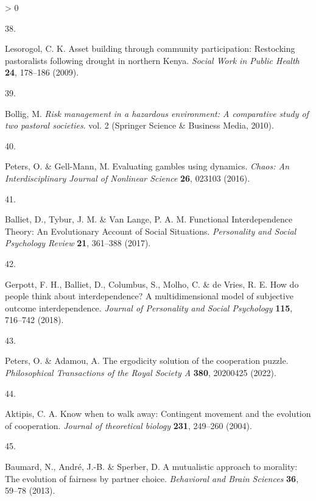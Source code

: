 \documentclass[
]{article}
\newlength{\cslhangindent}
\newlength{\csllabelwidth}
\newenvironment{CSLReferences}[2] %
 {%
  \setlength{\parindent}{0pt}
  \ifodd #1 \everypar{\setlength{\hangindent}{\cslhangindent}}\ignorespaces\fi
  \ifnum #2 > 0
  \setlength{\parskip}{#2\baselineskip}
  \fi
 }%
 {}
\newcommand{\CSLLeftMargin}[1]{\parbox[t]{\csllabelwidth}{#1}}
\newcommand{\CSLRightInline}[1]{\parbox[t]{\linewidth - \csllabelwidth}{#1}\break}
\begin{document}
\begin{CSLReferences}{0}{0}
\leavevmode\hypertarget{ref-lesorogolAssetBuildingCommunity2009}{}%
\CSLLeftMargin{38. }
\CSLRightInline{Lesorogol, C. K. Asset building through community participation: Restocking pastoralists following drought in northern {Kenya}. \emph{Social Work in Public Health} \textbf{24}, 178--186 (2009).}

\leavevmode\hypertarget{ref-bolligRiskManagementHazardous2010}{}%
\CSLLeftMargin{39. }
\CSLRightInline{Bollig, M. \emph{Risk management in a hazardous environment: {A} comparative study of two pastoral societies}. vol. 2 ({Springer Science \& Business Media}, 2010).}

\leavevmode\hypertarget{ref-petersEvaluatingGamblesUsing2016}{}%
\CSLLeftMargin{40. }
\CSLRightInline{Peters, O. \& Gell-Mann, M. Evaluating gambles using dynamics. \emph{Chaos: An Interdisciplinary Journal of Nonlinear Science} \textbf{26}, 023103 (2016).}

\leavevmode\hypertarget{ref-ballietFunctionalInterdependenceTheory2017}{}%
\CSLLeftMargin{41. }
\CSLRightInline{Balliet, D., Tybur, J. M. \& Van Lange, P. A. M. Functional {Interdependence Theory}: {An Evolutionary Account} of {Social Situations}. \emph{Personality and Social Psychology Review} \textbf{21}, 361--388 (2017).}

\leavevmode\hypertarget{ref-gerpottHowPeopleThink2018}{}%
\CSLLeftMargin{42. }
\CSLRightInline{Gerpott, F. H., Balliet, D., Columbus, S., Molho, C. \& de Vries, R. E. How do people think about interdependence? {A} multidimensional model of subjective outcome interdependence. \emph{Journal of Personality and Social Psychology} \textbf{115}, 716--742 (2018).}

\leavevmode\hypertarget{ref-peters2022ergodicity}{}%
\CSLLeftMargin{43. }
\CSLRightInline{Peters, O. \& Adamou, A. The ergodicity solution of the cooperation puzzle. \emph{Philosophical Transactions of the Royal Society A} \textbf{380}, 20200425 (2022).}

\leavevmode\hypertarget{ref-aktipis2004know}{}%
\CSLLeftMargin{44. }
\CSLRightInline{Aktipis, C. A. Know when to walk away: Contingent movement and the evolution of cooperation. \emph{Journal of theoretical biology} \textbf{231}, 249--260 (2004).}

\leavevmode\hypertarget{ref-baumard2013mutualistic}{}%
\CSLLeftMargin{45. }
\CSLRightInline{Baumard, N., André, J.-B. \& Sperber, D. A mutualistic approach to morality: The evolution of fairness by partner choice. \emph{Behavioral and Brain Sciences} \textbf{36}, 59--78 (2013).}


\end{CSLReferences}
\end{document}
